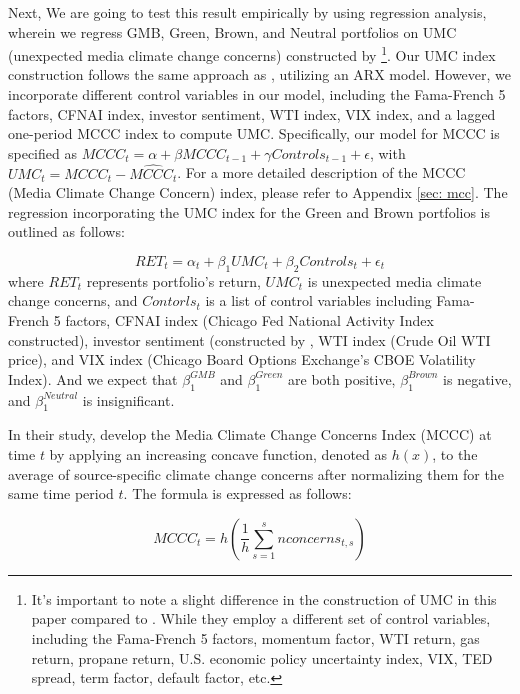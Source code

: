 \documentclass[12pt]{article}
\begin{document}
Next, We are going to test this result empirically by using regression analysis, wherein we regress GMB, Green, Brown, and Neutral portfolios on UMC (unexpected media climate change concerns) constructed by \cite{ardia2022climate}\footnote{It's important to note a slight difference in the construction of UMC in this paper compared to \cite{ardia2022climate}. While they employ a different set of control variables, including the Fama-French 5 factors, momentum factor, WTI return, gas return, propane return, U.S. economic policy uncertainty index, VIX, TED spread, term factor, default factor, etc.}. Our UMC index construction follows the same approach as \cite{ardia2022climate}, utilizing an ARX model. However, we incorporate different control variables in our model, including the Fama-French 5 factors, CFNAI index, investor sentiment, WTI index, VIX index, and a lagged one-period MCCC index to compute UMC. Specifically, our model for MCCC is specified as $MCCC_t = \alpha + \beta MCCC_{t-1} + \gamma Controls_{t-1} + \epsilon$, with $UMC_t = MCCC_t - \widehat{MCCC_t}$. For a more detailed description of the MCCC (Media Climate Change Concern) index, please refer to Appendix \ref{sec: mcc}. The regression incorporating the UMC index for the Green and Brown portfolios is outlined as follows:

\begin{equation}
    RET_t = \alpha_t + \beta_1 UMC_t + \beta_2 Controls_t + \epsilon_t
\label{eqn: test_pastor_model}
\end{equation}
where $RET_t$ represents portfolio's return, $UMC_t$ is unexpected media climate change concerns, and $Contorls_t$ is a list of control variables including Fama-French 5 factors, CFNAI index (Chicago Fed National Activity Index constructed), investor sentiment (constructed by \cite{baker2007investor}, WTI index (Crude Oil WTI price), and VIX index (Chicago Board Options Exchange's CBOE Volatility Index). And we expect that $\beta^{GMB}_1$ and $\beta^{Green}_1$ are both positive, $\beta^{Brown}_1$ is negative, and $\beta^{Neutral}_1$ is insignificant.

In their study, \cite{ardia2022climate} develop the Media Climate Change Concerns Index (MCCC) at time $t$ by applying an increasing concave function, denoted as $h(x)$, to the average of source-specific climate change concerns after normalizing them for the same time period $t$. The formula is expressed as follows:

\begin{equation}
\label{mccc}
MCCC_t = h\left(\frac{1}{h}\sum^s_{s=1}nconcerns_{t,s} \right)
\end{equation}
\end{document}
